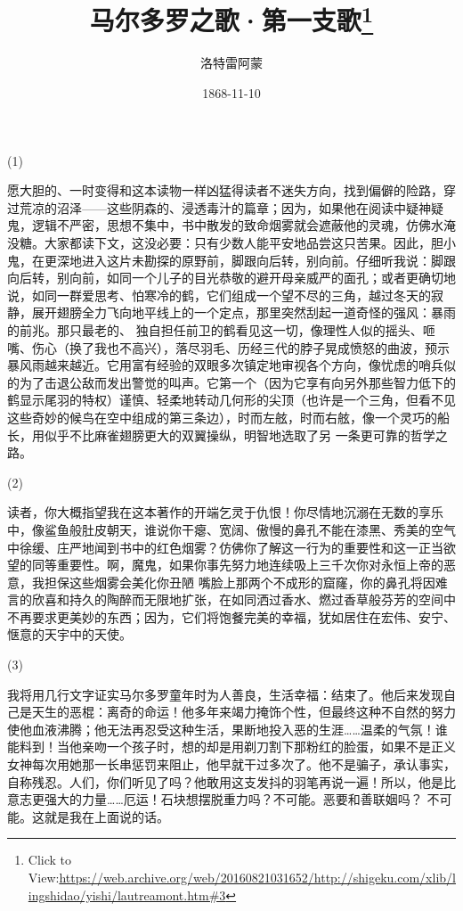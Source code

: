 \documentclass{article}
\title{马尔多罗之歌·第一支歌\footnote{Click to View:\url{https://web.archive.org/web/20160821031652/http://shigeku.com/xlib/lingshidao/yishi/lautreamont.htm#3}}}
\author{洛特雷阿蒙}
\date{1868-11-10}
\begin{document}

\maketitle


\Large


﻿(1) 

愿大胆的、一时变得和这本读物一样凶猛得读者不迷失方向，找到偏僻的险路，穿过荒凉的沼泽——这些阴森的、浸透毒汁的篇章；因为，如果他在阅读中疑神疑鬼，逻辑不严密，思想不集中，书中散发的致命烟雾就会遮蔽他的灵魂，仿佛水淹没糖。大家都读下文，这没必要：只有少数人能平安地品尝这只苦果。因此，胆小鬼，在更深地进入这片未勘探的原野前，脚跟向后转，别向前。仔细听我说：脚跟向后转，别向前，如同一个儿子的目光恭敬的避开母亲威严的面孔；或者更确切地说，如同一群爱思考、怕寒冷的鹤，它们组成一个望不尽的三角，越过冬天的寂静，展开翅膀全力飞向地平线上的一个定点，那里突然刮起一道奇怪的强风：暴雨的前兆。那只最老的、
\newpage
独自担任前卫的鹤看见这一切，像理性人似的摇头、咂嘴、伤心（换了我也不高兴），落尽羽毛、历经三代的脖子晃成愤怒的曲波，预示暴风雨越来越近。它用富有经验的双眼多次镇定地审视各个方向，像忧虑的哨兵似的为了击退公敌而发出警觉的叫声。它第一个（因为它享有向另外那些智力低下的鹤显示尾羽的特权）谨慎、轻柔地转动几何形的尖顶（也许是一个三角，但看不见这些奇妙的候鸟在空中组成的第三条边），时而左舷，时而右舷，像一个灵巧的船长，用似乎不比麻雀翅膀更大的双翼操纵，明智地选取了另
一条更可靠的哲学之路。 


(2) 

读者，你大概指望我在这本著作的开端乞灵于仇恨！你尽情地沉溺在无数的享乐中，像鲨鱼般肚皮朝天，谁说你干瘪、宽阔、傲慢的鼻孔不能在漆黑、秀美的空气中徐缓、庄严地闻到书中的红色烟雾？仿佛你了解这一行为的重要性和这一正当欲望的同等重要性。啊，魔鬼，如果你事先努力地连续吸上三千次你对永恒上帝的恶意，我担保这些烟雾会美化你丑陋
\newpage
嘴脸上那两个不成形的窟窿，你的鼻孔将因难言的欣喜和持久的陶醉而无限地扩张，在如同洒过香水、燃过香草般芬芳的空间中不再要求更美妙的东西；因为，它们将饱餐完美的幸福，犹如居住在宏伟、安宁、
惬意的天宇中的天使。 


(3) 

我将用几行文字证实马尔多罗童年时为人善良，生活幸福：结束了。他后来发现自己是天生的恶棍：离奇的命运！他多年来竭力掩饰个性，但最终这种不自然的努力使他血液沸腾；他无法再忍受这种生活，果断地投入恶的生涯……温柔的气氛！谁能料到！当他亲吻一个孩子时，想的却是用剃刀割下那粉红的脸蛋，如果不是正义女神每次用她那一长串惩罚来阻止，他早就干过多次了。他不是骗子，承认事实，自称残忍。人们，你们听见了吗？他敢用这支发抖的羽笔再说一遍！所以，他是比意志更强大的力量……厄运！石块想摆脱重力吗？不可能。恶要和善联姻吗？
不可能。这就是我在上面说的话。 
\end{document}
